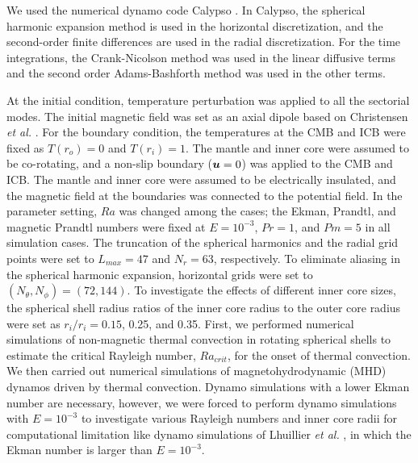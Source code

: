 We used the numerical dynamo code Calypso \cite{Matsui:2014}. In Calypso, the spherical harmonic expansion method is used in the horizontal discretization, and the second-order finite differences are used in the radial discretization. For the time integrations, the Crank-Nicolson method was used in the linear diffusive terms and the second order Adams-Bashforth method was used in the other terms.

At the initial condition, temperature perturbation was applied to all the sectorial modes. The initial magnetic field was set as an axial dipole based on Christensen {\it et al.} . For the boundary condition, the temperatures at the CMB and ICB were fixed as $T(r_{o}) = 0$ and  $T(r_{i}) = 1$. The mantle and inner core were assumed to be co-rotating, and a non-slip boundary ($\mbox{\boldmath$u$} = 0$) was applied to the CMB and ICB. The mantle and inner core were assumed to be electrically insulated, and the magnetic field at the boundaries was connected to the potential field.
In the parameter setting, $Ra$ was changed among the cases; the Ekman, Prandtl, and magnetic Prandtl numbers were fixed at $E = 10^{-3}$, $Pr = 1$, and $Pm = 5$ in all simulation cases. The truncation of the spherical harmonics and the radial grid points were set to $L_{max} = 47$ and $N_{r} = 63$, respectively. To eliminate aliasing in the spherical harmonic expansion, horizontal grids were set to $(N_{\theta}, N_{\phi}) = (72, 144)$. To investigate the effects of different inner core sizes, the spherical shell radius ratios of the inner core radius to the outer core radius were set as $r_{i} / r_{i} = 0.15$, 0.25, and 0.35. First, we performed numerical simulations of non-magnetic thermal convection in rotating spherical shells to estimate the critical Rayleigh number, $Ra_{crit}$, for the onset of thermal convection. We then carried out numerical simulations of magnetohydrodynamic (MHD) dynamos driven by thermal convection. 
{\color{red}
Dynamo simulations with a lower Ekman number are necessary, however, we were forced to perform dynamo simulations with $E = 10^{-3}$ to investigate various Rayleigh numbers and inner core radii for computational limitation like dynamo simulations of Lhuillier {\it et al.} , in which the Ekman number is larger than $E = 10^{-3}$.
}
